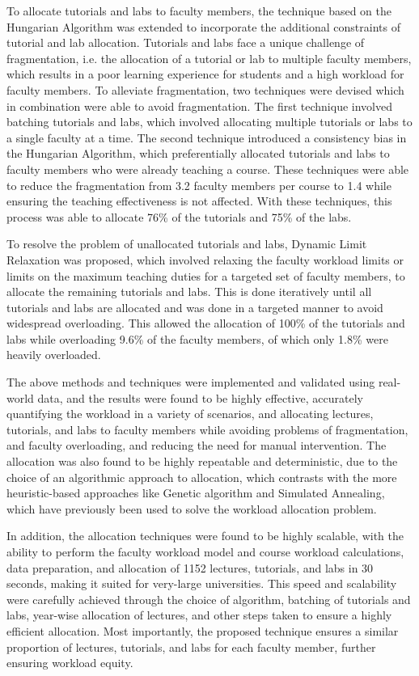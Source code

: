 To allocate tutorials and labs to faculty members, the technique based on the Hungarian Algorithm was extended to incorporate the additional constraints of tutorial and lab allocation. Tutorials and labs face a unique challenge of fragmentation, i.e. the allocation of a tutorial or lab to multiple faculty members, which results in a poor learning experience for students and a high workload for faculty members. To alleviate fragmentation, two techniques were devised which in combination were able to avoid fragmentation. The first technique involved batching tutorials and labs, which involved allocating multiple tutorials or labs to a single faculty at a time. The second technique introduced a consistency bias in the Hungarian Algorithm, which preferentially allocated tutorials and labs to faculty members who were already teaching a course. These techniques were able to reduce the fragmentation from 3.2 faculty members per course to 1.4 while ensuring the teaching effectiveness is not affected. With these techniques, this process was able to allocate 76\% of the tutorials and 75\% of the labs.

To resolve the problem of unallocated tutorials and labs, Dynamic Limit Relaxation was proposed, which involved relaxing the faculty workload limits or limits on the maximum teaching duties for a targeted set of faculty members, to allocate the remaining tutorials and labs. This is done iteratively until all tutorials and labs are allocated and was done in a targeted manner to avoid widespread overloading. This allowed the allocation of 100\% of the tutorials and labs while overloading 9.6\% of the faculty members, of which only 1.8\% were heavily overloaded.


The above methods and techniques were implemented and validated using real-world data, and the results were found to be highly effective, accurately quantifying the workload in a variety of scenarios, and allocating lectures, tutorials, and labs to faculty members while avoiding problems of fragmentation, and faculty overloading, and reducing the need for manual intervention. The allocation was also found to be highly repeatable and deterministic, due to the choice of an algorithmic approach to allocation, which contrasts with the more heuristic-based approaches like Genetic algorithm and Simulated Annealing, which have previously been used to solve the workload allocation problem.


In addition, the allocation techniques were found to be highly scalable, with the ability to perform the faculty workload model and course workload calculations, data preparation, and allocation of 1152 lectures, tutorials, and labs in 30 seconds, making it suited for very-large universities. This speed and scalability were carefully achieved through the choice of algorithm, batching of tutorials and labs, year-wise allocation of lectures, and other steps taken to ensure a highly efficient allocation. Most importantly, the proposed technique ensures a similar proportion of lectures, tutorials, and labs for each faculty member, further ensuring workload equity.

